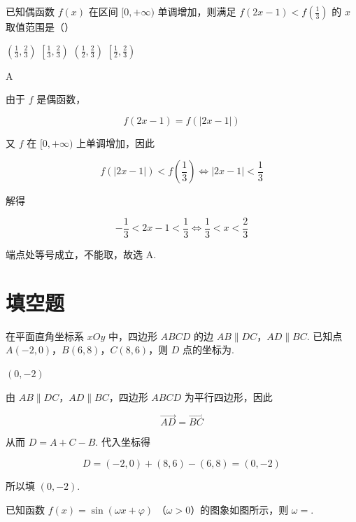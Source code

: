 \begin{problem}
已知偶函数 \( f(x) \) 在区间 \([0, +\infty)\) 单调增加，则满足 \( f(2x - 1) < f\left(\frac{1}{3}\right) \) 的 \( x \) 取值范围是（\quad）

\choices
    {\(\left(\frac{1}{3},\frac{2}{3}\right)\)}
    {\(\left[\frac{1}{3},\frac{2}{3}\right)\)}
    {\(\left(\frac{1}{2},\frac{2}{3}\right)\)}
    {\(\left[\frac{1}{2},\frac{2}{3}\right)\)}
\end{problem}

\begin{answer}
    A
\end{answer}

\begin{solution}
由于 \(f\) 是偶函数，

\[
f(2x-1)=f(|2x-1|)
\]

又 \(f\) 在 \([0,+\infty)\) 上单调增加，因此

\[
f(|2x-1|)<f\left(\frac13\right)
\Longleftrightarrow |2x-1|<\frac13
\]

解得

\[
-\frac13<2x-1<\frac13
\Longleftrightarrow \frac13<x<\frac23
\]

端点处等号成立，不能取，故选 A.
\end{solution}

\section{填空题}

\begin{problem}
在平面直角坐标系 \(xOy\) 中，四边形 \(ABCD\) 的边 \(AB\parallel DC\)，\(AD\parallel BC\). 已知点 \(A(-2,0)\)，\(B(6,8)\)，\(C(8,6)\)，则 \(D\) 点的坐标为\fillinblank{}.
\end{problem}

\begin{answer}
    \((0,-2)\)
\end{answer}

\begin{solution}
由 \(AB\parallel DC\)，\(AD\parallel BC\)，四边形 \(ABCD\) 为平行四边形，因此

\[
\overrightarrow{AD}=\overrightarrow{BC}
\]

从而 \(D=A+C-B\). 代入坐标得

\[
D=(-2,0)+(8,6)-(6,8)=(0,-2)
\]

所以填 \((0,-2)\).
\end{solution}

\begin{problem}
已知函数 \( f(x) = \sin (\omega x + \varphi) \) （\(\omega > 0\)）的图象如图所示，则 \(\omega = \)\fillinblank{}.

\end{problem}

